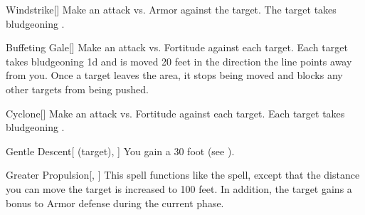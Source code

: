 \lowercase{\hypertarget{spell:Windstrike}{}}\label{spell:Windstrike}
\begin{freeability}[Rank 1]{\hypertarget{spell:Windstrike}{Windstrike}}[]
Make an attack vs. Armor against the target.
\hit The target takes bludgeoning .
\end{freeability}
\vspace{0.25em}



\lowercase{\hypertarget{spell:Buffeting Gale}{}}\label{spell:Buffeting Gale}
\begin{freeability}[Rank 3]{\hypertarget{spell:Buffeting Gale}{Buffeting Gale}}[]
Make an attack vs. Fortitude against each target.
\hit Each target takes bludgeoning  \minus1d and is moved 20 feet in the direction the line points away from you.
Once a target leaves the area, it stops being moved and blocks any other targets from being pushed.
\end{freeability}
\vspace{0.25em}



\lowercase{\hypertarget{spell:Cyclone}{}}\label{spell:Cyclone}
\begin{freeability}[Rank 3]{\hypertarget{spell:Cyclone}{Cyclone}}[]
Make an attack vs. Fortitude against each target.
\hit Each target takes bludgeoning .
\end{freeability}
\vspace{0.25em}



\lowercase{\hypertarget{spell:Gentle Descent}{}}\label{spell:Gentle Descent}
\begin{attuneability}[Rank 3]{\hypertarget{spell:Gentle Descent}{Gentle Descent}}[ (target), ]
You gain a 30 foot  (see ).
\end{attuneability}
\vspace{0.25em}



\lowercase{\hypertarget{spell:Greater Propulsion}{}}\label{spell:Greater Propulsion}
\begin{freeability}[Rank 3]{\hypertarget{spell:Greater Propulsion}{Greater Propulsion}}[, ]
This spell functions like the  spell, except that the distance you can move the target is increased to 100 feet.
In addition, the target gains a  bonus to Armor defense during the current phase.
\end{freeability}
\vspace{0.25em}



